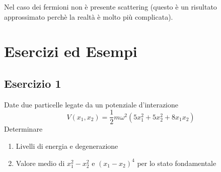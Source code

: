 Nel caso dei fermioni non \`e presente scattering (questo \`e un risultato approssimato perch\`e la realt\`a \`e molto pi\`u complicata).

\section{Esercizi ed Esempi}

\subsection{Esercizio 1}
Date due particelle legate da un potenziale d'interazione 
\begin{equation*}
	V(x_1,x_2) = \frac{1}{2}m \omega^2(5x_1^2+5x_2^2 +8x_1x_2)
\end{equation*}
Determinare 
\begin{enumerate}
	\item Livelli di energia e degenerazione
	\item Valore medio di $x_1^2-x_2^2$ e $(x_1-x_2)^4$ per lo stato fondamentale 
\end{enumerate}
\newpage


